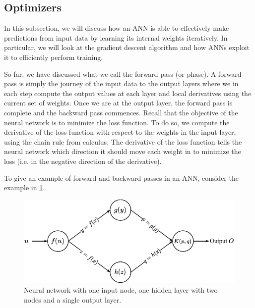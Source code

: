 \subsection{Optimizers}
\label{sec:optimizers-ann}
In this subsection, we will discuss how an ANN is able to effectively make predictions from input data by learning its internal weights iteratively. In particular, we will look at the gradient descent algorithm and how ANNs exploit it to efficiently perform training.

So far, we have discussed what we call the forward pass (or phase). A forward pass is simply the journey of the input data to the output layers where we in each step compute the output values at each layer and local derivatives using the current set of weights. Once we are at the output layer, the forward pass is complete and the backward pass commences. Recall that the objective of the neural network is to minimize the loss function. To do so, we compute the derivative of the loss function with respect to the weights in the input layer, using the chain rule from calculus. The derivative of the loss function tells the neural network which direction it should move each weight in to minimize the loss (i.e. in the negative direction of the derivative).

To give an example of forward and backward passes in an ANN, consider the example in \cref{fig:neural-network-example-backprop}.
\begin{figure}[H]
    \centering
    \includegraphics[width=12cm]{thesis/figures/artificial-neural-network-backprop-example_cropped.pdf}
    \caption{Neural network with one input node, one hidden layer with two nodes and a single output layer.}
    \label{fig:neural-network-example-backprop}
\end{figure}

